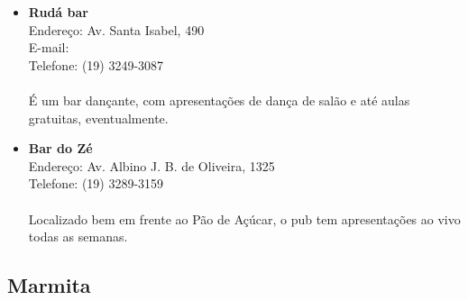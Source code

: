 \begin{itemize}
\item \textbf{Rudá bar}
  \\Endereço: Av. Santa Isabel, 490
  \\E-mail: 
  \\Telefone: (19) 3249-3087
  \\
  \\É um bar dançante, com apresentações de dança de salão e até aulas
  gratuitas, eventualmente.
\item \textbf{Bar do Zé}
  \\Endereço: Av. Albino J. B. de Oliveira, 1325
  \\Telefone: (19) 3289-3159
  \\
  \\Localizado bem em frente ao Pão de Açúcar, o pub tem apresentações ao vivo
  todas as semanas.
\end{itemize}

\subsection{Marmita}
